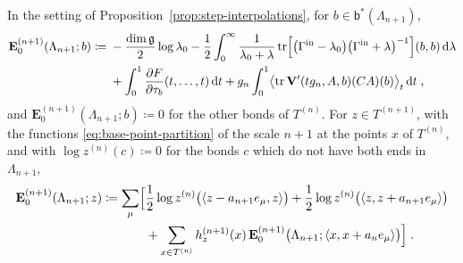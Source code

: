 \documentclass[11pt]{preprint}
\newcommand{\dd}{\mathrm{d}}
\numberwithin{equation}{section}
\begin{document}
\begin{definition}\label{def:bond-terms}
In the setting of Proposition~\ref{prop:step-interpolations}, for $b \in \mathsf b^*(\Lambda_{n+1})$,
\begin{equation}\label{eq:bond-term}
\begin{aligned}
    \mathbf E^{(n+1)}_0(\Lambda_{n+1}; b) \coloneqq{}& -\frac{\dim\mathfrak g}{2}\log\lambda_0 - \frac{1}{2}\int_0^\infty\frac{1}{\lambda_0 + \lambda}\tr\Bigl[\bigl(\Gamma^{\mathrm{in}} - \lambda_0\bigr)\bigl(\Gamma^{\mathrm{in}} + \lambda\bigr)^{-1}\Bigr](b, b)\,\dd\lambda\\
    &+ \int_0^1\frac{\partial F}{\partial\tau_b}(t, \dots, t)\,\dd t + g_n\int_0^1\bigl\langle\tr\mathbf V'(tg_n, A, b)(CA)(b)\bigr\rangle_t\,\dd t\;,
\end{aligned}
\end{equation}
and $\mathbf E^{(n+1)}_0(\Lambda_{n+1}; b) \coloneqq 0$ for the other bonds of $T^{(n)}$. For $z \in T^{(n+1)}$, with the functions \eqref{eq:base-point-partition} of the scale $n + 1$ at the points $x$ of $T^{(n)}$, and with $\log z^{(n)}(c) \coloneqq 0$ for the bonds $c$ which do not have both ends in $\Lambda_{n+1}$,
\begin{equation}\label{eq:base-point-term}
\begin{aligned}
    \mathbf E^{(n+1)}_0(\Lambda_{n+1}; z) \coloneqq \sum_{\mu}\Bigl[&\frac{1}{2}\log z^{(n)}\bigl(\langle z - a_{n+1}e_\mu, z\rangle\bigr) + \frac{1}{2}\log z^{(n)}\bigl(\langle z, z + a_{n+1}e_\mu\rangle\bigr)\\
    &+ \sum_{x \in T^{(n)}}h^{(n+1)}_z(x)\,\mathbf E^{(n+1)}_0\bigl(\Lambda_{n+1}; \langle x, x + a_ne_\mu\rangle\bigr)\Bigr]\;.
\end{aligned}
\end{equation}
\end{definition}
\end{document}
